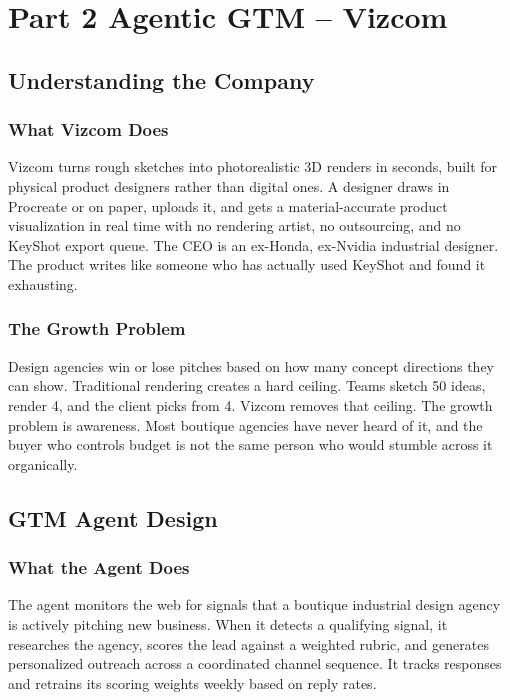 \documentclass[11pt, letterpaper]{article}
\begin{document}
\section{Part 2 \quad Agentic GTM -- Vizcom}

\subsection{Understanding the Company}

\subsubsection{What Vizcom Does}

Vizcom turns rough sketches into photorealistic 3D renders in seconds, built
for physical product designers rather than digital ones. A designer draws in
Procreate or on paper, uploads it, and gets a material-accurate product
visualization in real time with no rendering artist, no outsourcing, and no
KeyShot export queue. The CEO is an ex-Honda, ex-Nvidia industrial designer.
The product writes like someone who has actually used KeyShot and found it
exhausting.

\subsubsection{The Growth Problem}

Design agencies win or lose pitches based on how many concept directions they
can show. Traditional rendering creates a hard ceiling. Teams sketch 50 ideas,
render 4, and the client picks from 4. Vizcom removes that ceiling. The growth
problem is awareness. Most boutique agencies have never heard of it, and the
buyer who controls budget is not the same person who
would stumble across it organically.

\subsection{GTM Agent Design}

\subsubsection{What the Agent Does}

The agent monitors the web for signals that a boutique industrial design agency
is actively pitching new business. When it detects a qualifying signal, it
researches the agency, scores the lead against a weighted rubric, and generates
personalized outreach across a coordinated channel sequence. It tracks
responses and retrains its scoring weights weekly based on reply rates.
\end{document}

